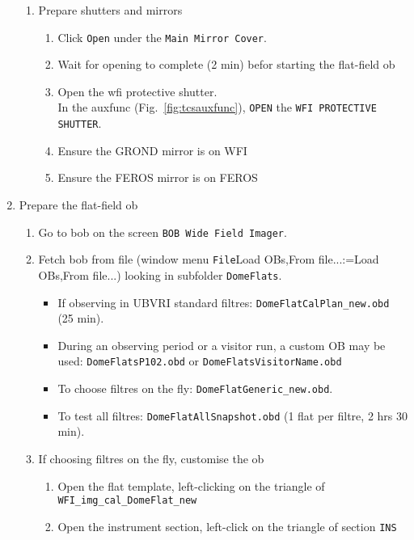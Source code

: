 \documentclass[11pt,fleqn]{book} %
\makeatletter
\def\menu#1#2{\texttt{#1}\ifx{}#2\else\@for\@x:=#2\do{$\rightarrow$\texttt{\@x}}\fi}
\def\wmenu#1#2{window menu \menu{#1}{#2}}
\def\fetchob{\wmenu{File}{Load OBs,From file...}}
\makeatother
\begin{document}
\begin{enumerate}
\begin{enumerate}
            \item Prepare shutters and mirrors
            \begin{enumerate}
               \item Click \texttt{Open} under the \texttt{Main Mirror Cover}.
               \item Wait for opening to complete (2 min) befor starting the flat-field \gls{ob}
               \item Open the \gls{wfi} protective shutter.\\
                     In the \gls{auxfunc} (Fig.~\ref{fig:tcsauxfunc}), \texttt{OPEN} the \texttt{WFI PROTECTIVE SHUTTER}.
               \item Ensure the GROND mirror is on WFI
               \item Ensure the FEROS mirror is on FEROS
             \end{enumerate}
         \end{enumerate}
     \item Prepare the flat-field \gls{ob}
     \begin{enumerate}
        \item Go to \gls{bob} on the screen \texttt{BOB Wide Field Imager}.
        \item Fetch \gls{bob} from file (\fetchob) looking in subfolder \texttt{DomeFlats}.
        \begin{itemize}
           \item If observing in UBVRI standard filtres: \texttt{DomeFlatCalPlan\_new.obd} (25 min).
           \item During an observing period or a visitor run, a custom OB may be used: \texttt{DomeFlatsP102.obd} or         \texttt{DomeFlatsVisitorName.obd}
           \item To choose filtres on the fly: \texttt{DomeFlatGeneric\_new.obd}.
           \item To test all filtres: \texttt{DomeFlatAllSnapshot.obd} (1 flat per filtre, 2 hrs 30 min).
        \end{itemize}
        \item If choosing filtres on the fly, customise the ob
              \begin{enumerate}
                 \item Open the flat template, left-clicking on the triangle of \texttt{WFI\_img\_cal\_DomeFlat\_new}
                 \item Open the instrument section, left-click on the triangle of section \texttt{INS}

\end{enumerate}
\end{enumerate}
\end{enumerate}
\end{document}
